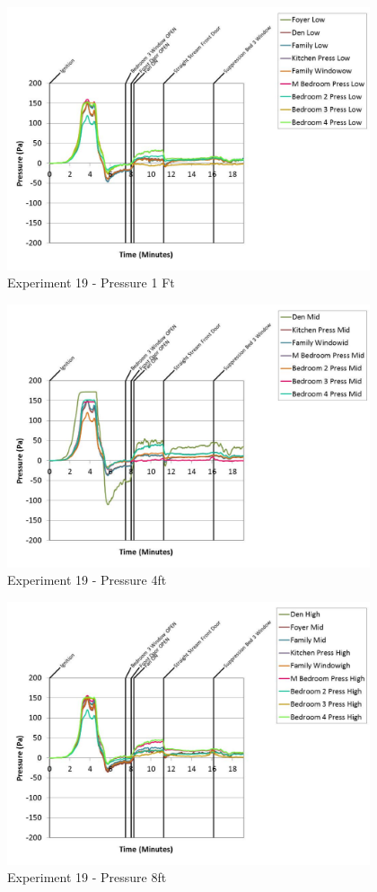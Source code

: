 \documentclass{article}
\begin{document}
\begin{appendices}
	\begin{figure}[h!]
		\centering
		\includegraphics[height=3.05in]{0_Images/Results_Charts/Exp_19_Charts/Pressure1Ft.pdf}
		\caption{Experiment 19 - Pressure 1 Ft}
	\end{figure}
 
	\clearpage

	\begin{figure}[h!]
		\centering
		\includegraphics[height=3.05in]{0_Images/Results_Charts/Exp_19_Charts/Pressure4ft.pdf}
		\caption{Experiment 19 - Pressure 4ft}
	\end{figure}
 

	\begin{figure}[h!]
		\centering
		\includegraphics[height=3.05in]{0_Images/Results_Charts/Exp_19_Charts/Pressure8ft.pdf}
		\caption{Experiment 19 - Pressure 8ft}
	\end{figure}
 

\end{appendices}
\end{document}
